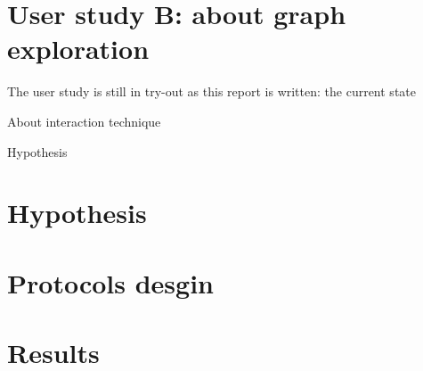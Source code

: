 \section{User study B: about graph
exploration}\label{user-study-b-about-graph-exploration}




The user study is still in try-out as this report is written: the current state

About interaction technique

Hypothesis

\section{Hypothesis}\label{hypothesis-1}

\section{Protocols desgin}\label{protocols-desgin}

\section{Results}\label{results-1}

